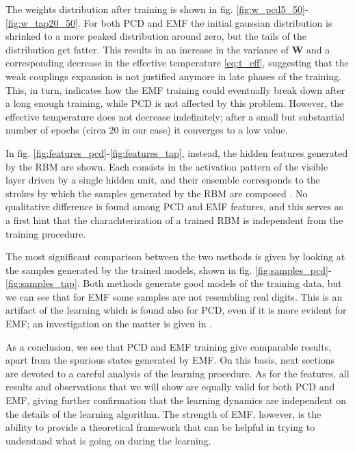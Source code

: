 \documentclass{revtex4-1}
\begin{document}
The weights distribution after training is shown in fig. \ref{fig:w_pcd5_50}-\ref{fig:w_tap20_50}. For both PCD and EMF the initial gaussian distribution is shrinked to a more peaked distribution around zero, but the tails of the distribution get fatter. This results in an increase in the variance of \(\mathbf{W}\) and a corresponding decrease in the effective temperature \eqref{eq:t_eff}, suggesting that the weak couplings expansion is not justified anymore in late phases of the training. This, in turn, indicates how the EMF training could eventually break down after a long enough training, while PCD is not affected by this problem. However, the effective temperature does not decrease indefinitely; after a small but substantial number of epochs (circa \(20\) in our case) it converges to a low value.

In fig. \ref{fig:features_pcd}-\ref{fig:features_tap}, instead, the hidden features generated by the RBM are shown. Each consists in the activation pattern of the visible layer driven by a single hidden unit, and their ensemble corresponds to the strokes by which the samples generated by the RBM are composed \cite{monasson}. No qualitative difference is found among PCD and EMF features, and this serves as a first hint that the charachterization of a trained RBM is independent from the training procedure. 

The most significant comparison between the two methods is given by looking at the samples generated by the trained models, shown in fig. \ref{fig:samples_pcd}-\ref{fig:samples_tap}. Both methods generate good models of the training data, but we can see that for EMF some samples are not resembling real digits. This is an artifact of the learning which is found also for PCD, even if it is more evident for EMF; an investigation on the matter is given in \cite{clement}.

As a conclusion, we see that PCD and EMF training give comparable results, apart from the spurious states generated by EMF. On this basis, next sections are devoted to a careful analysis of the learning procedure. As for the features, all results and observations that we will show are equally valid for both PCD and EMF, giving further confirmation that the learning dynamics are independent on the details of the learning algorithm. The strength of EMF, however, is the ability to provide a theoretical framework that can be helpful in trying to understand what is going on during the learning.

\end{document}

